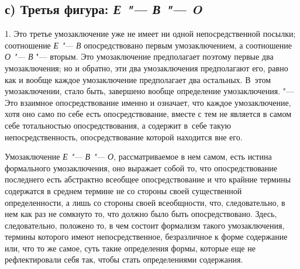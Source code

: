 \subsection[с) Третья фигура]
{с) Третья фигура: {\em Е "--- В "--- O}}

1. Это третье умозаключение уже не имеет ни одной
непосредственной посылки; соотношение {\em Е "--- В}
опосредствовано первым умозаключением, а соотношение
{\em О "--- В} "--- вторым. Это умозаключение предполагает поэтому первые два
умозаключения; но и обратно, эти два умозаключения предполагают его, равно
как и вообще каждое умозаключение предполагает два остальных. В~этом
умозаключении, стало быть, завершено вообще определение умозаключения.
"--- Это взаимное опосредствование именно и означает, что каждое
умозаключение, хотя оно само по себе есть опосредствование, вместе с тем не
является в самом себе тотальностью опосредствования, а содержит в~себе
такую непосредственность, опосредствование которой находится вне его.

Умозаключение {\em Е "--- В "--- О}, рассматриваемое в нем
самом, есть истина формального умозаключения, оно выражает собой то, что
опосредствование последнего есть абстрактно всеобщее опосредствование и что
крайние термины содержатся в среднем термине не со стороны своей
существенной определенности, а лишь со стороны своей всеобщности, что,
следовательно, в нем как раз не сомкнуто то, что должно было быть
опосредствовано. Здесь, следовательно, положено то, в чем состоит формализм
такого умозаключения, термины которого имеют
непосредственное, безразличное к форме содержание или, что то же самое,
суть такие определения формы, которые еще не рефлектировали себя так, чтобы
стать определениями содержания.

